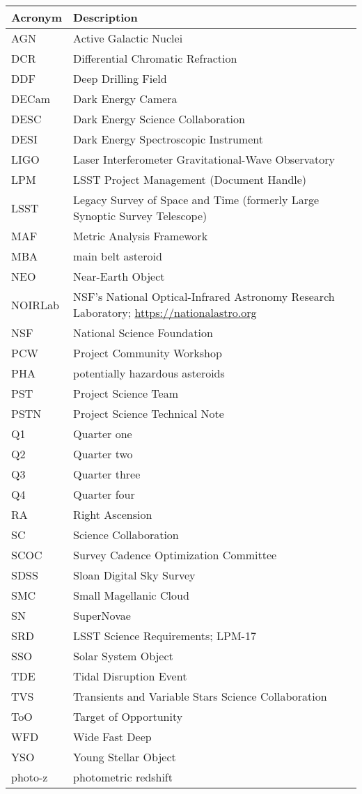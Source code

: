 \addtocounter{table}{-1}
\begin{longtable}{p{}p{}}\hline
\textbf{Acronym} & \textbf{Description}  \\\hline

AGN & Active Galactic Nuclei \\\hline
DCR & Differential Chromatic Refraction \\\hline
DDF & Deep Drilling Field \\\hline
DECam & Dark Energy Camera \\\hline
DESC & Dark Energy Science Collaboration \\\hline
DESI & Dark Energy Spectroscopic Instrument \\\hline
LIGO & Laser Interferometer Gravitational-Wave Observatory \\\hline
LPM & LSST Project Management (Document Handle) \\\hline
LSST & Legacy Survey of Space and Time (formerly Large Synoptic Survey Telescope) \\\hline
MAF & Metric Analysis Framework \\\hline
MBA & main belt asteroid \\\hline
NEO & Near-Earth Object \\\hline
NOIRLab & NSF's National Optical-Infrared Astronomy Research Laboratory; \url{https://nationalastro.org} \\\hline
NSF & National Science Foundation \\\hline
PCW & Project Community Workshop \\\hline
PHA & potentially hazardous asteroids \\\hline
PST & Project Science Team \\\hline
PSTN & Project Science Technical Note \\\hline
Q1 & Quarter one \\\hline
Q2 & Quarter two \\\hline
Q3 & Quarter three \\\hline
Q4 & Quarter four \\\hline
RA & Right Ascension \\\hline
SC & Science Collaboration \\\hline
SCOC & Survey Cadence Optimization Committee \\\hline
SDSS & Sloan Digital Sky Survey \\\hline
SMC & Small Magellanic Cloud \\\hline
SN & SuperNovae \\\hline
SRD & LSST Science Requirements; LPM-17 \\\hline
SSO & Solar System Object \\\hline
TDE & Tidal Disruption Event \\\hline
TVS & Transients and Variable Stars Science Collaboration \\\hline
ToO & Target of Opportunity \\\hline
WFD & Wide Fast Deep \\\hline
YSO & Young Stellar Object \\\hline
photo-z & photometric redshift \\\hline
\end{longtable}
